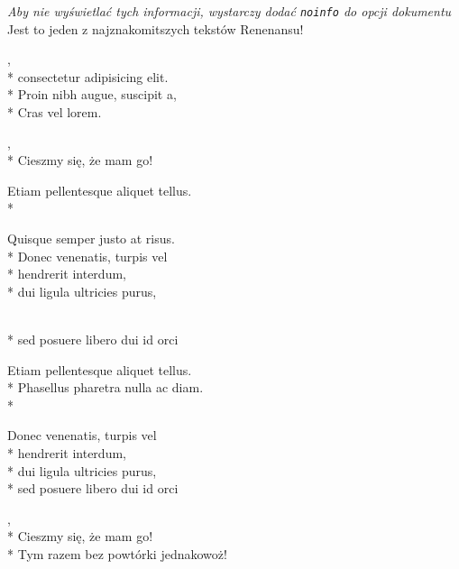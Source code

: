 
\begin{info}
  \emph{Aby nie wyświetlać tych informacji, wystarczy dodać \texttt{noinfo} do opcji dokumentu}
  Jest to jeden z najznakomitszych tekstów Renenansu!
\end{info}

\begin{lyrics}[longestline={Lorem Lorem Lorem Lorem Lorem}]
  ,\\*
  consectetur adipisicing elit.\\*
  Proin nibh augue, suscipit a,\\*
  Cras vel lorem.

  \begin{chorus}%
    ,\\*
    Cieszmy się, że mam go!
  \end{chorus}
  
  Etiam pellentesque aliquet tellus.\\*
  \begin{markverses}%
    Quisque semper justo at risus.\\*
    Donec venenatis, turpis vel\\*
    hendrerit interdum,\\*
    dui ligula ultricies purus,\end{markverses}\\*
  sed posuere libero dui id orci

  \chorusref

  Etiam pellentesque aliquet tellus.\\*
  Phasellus pharetra nulla ac diam.\\*
  \begin{markverses}[marktext={można też napisać co innego}]
    Donec venenatis, turpis vel\\*
    hendrerit interdum,\\*
    dui ligula ultricies purus,\\*
    sed posuere libero dui id orci
  \end{markverses}

  \begin{chorus}[mark=false]%
    ,\\*
    Cieszmy się, że mam go! \\*
    Tym razem bez powtórki jednakowoż!
  \end{chorus}


\end{lyrics}
